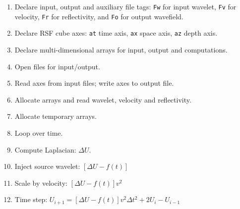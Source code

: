 \tiny

\normalsize

\begin{enumerate}
\item Declare input, output and auxiliary file tags:
\texttt{Fw} for input wavelet, 
\texttt{Fv} for velocity,
\texttt{Fr} for reflectivity, and
\texttt{Fo} for output wavefield.
\tiny

\normalsize

\item Declare RSF cube axes:
\texttt{at} time axis,
\texttt{ax} space axis,
\texttt{az} depth axis.
\tiny

\normalsize

\item Declare multi-dimensional arrays for input, output and computations.
\tiny

\normalsize

\item Open files for input/output.
\tiny

\normalsize

\item Read axes from input files; write axes to output file.
\tiny

\normalsize

\item Allocate arrays and read wavelet, velocity and reflectivity.
\tiny

\normalsize

\item Allocate temporary arrays.
\tiny

\normalsize

\item Loop over time.
\tiny

\normalsize

\item Compute Laplacian: $\Delta U$.
\tiny

\normalsize

\item Inject source wavelet: $\left[ \Delta U - f(t) \right]$
\tiny

\normalsize

\item Scale by velocity: $\left[ \Delta U - f(t) \right] v^2$
\tiny

\normalsize

\item Time step: 
$U_{i+1} = \left[ \Delta U -f(t) \right] v^2 \Delta t^2 + 2 U_{i} - U_{i-1}$
\tiny

\normalsize

\end{enumerate}

